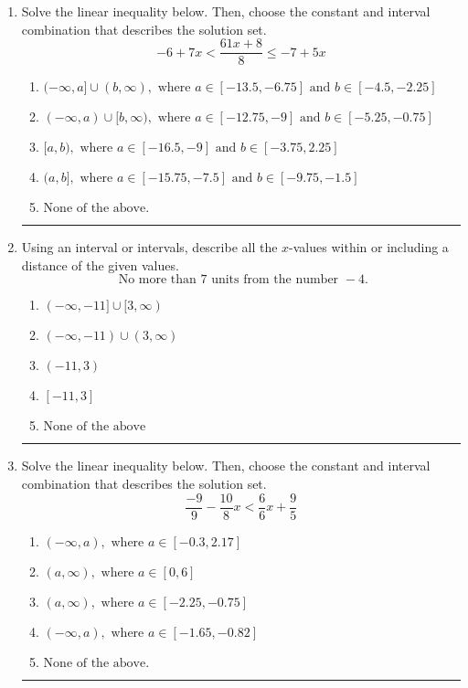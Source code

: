 \documentclass[14pt]{extbook}
\newcommand{\litem}[1]{\item#1\hspace*{-1cm}\rule{\textwidth}{0.4pt}}
\begin{document}
\begin{enumerate}
\litem{
Solve the linear inequality below. Then, choose the constant and interval combination that describes the solution set.\[ -6 + 7 x < \frac{61 x + 8}{8} \leq -7 + 5 x \]\begin{enumerate}[label=\Alph*.]
\item \( (-\infty, a] \cup (b, \infty), \text{ where } a \in [-13.5, -6.75] \text{ and } b \in [-4.5, -2.25] \)
\item \( (-\infty, a) \cup [b, \infty), \text{ where } a \in [-12.75, -9] \text{ and } b \in [-5.25, -0.75] \)
\item \( [a, b), \text{ where } a \in [-16.5, -9] \text{ and } b \in [-3.75, 2.25] \)
\item \( (a, b], \text{ where } a \in [-15.75, -7.5] \text{ and } b \in [-9.75, -1.5] \)
\item \( \text{None of the above.} \)

\end{enumerate} }
\litem{
Using an interval or intervals, describe all the $x$-values within or including a distance of the given values.\[ \text{ No more than } 7 \text{ units from the number } -4. \]\begin{enumerate}[label=\Alph*.]
\item \( (-\infty, -11] \cup [3, \infty) \)
\item \( (-\infty, -11) \cup (3, \infty) \)
\item \( (-11, 3) \)
\item \( [-11, 3] \)
\item \( \text{None of the above} \)

\end{enumerate} }
\litem{
Solve the linear inequality below. Then, choose the constant and interval combination that describes the solution set.\[ \frac{-9}{9} - \frac{10}{8} x < \frac{6}{6} x + \frac{9}{5} \]\begin{enumerate}[label=\Alph*.]
\item \( (-\infty, a), \text{ where } a \in [-0.3, 2.17] \)
\item \( (a, \infty), \text{ where } a \in [0, 6] \)
\item \( (a, \infty), \text{ where } a \in [-2.25, -0.75] \)
\item \( (-\infty, a), \text{ where } a \in [-1.65, -0.82] \)
\item \( \text{None of the above}. \)


\end{enumerate}}
\end{enumerate}
\end{document}

